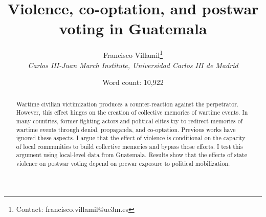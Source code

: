 \documentclass[12pt, notitlepage]{article}
\title{\Large Violence, co-optation, and postwar voting in Guatemala}
\author{Francisco Villamil\footnote{Contact: francisco.villamil@uc3m.es}\\\textit{Carlos III-Juan March Institute, Universidad Carlos III de Madrid}}
\date{Word count: 10,922}
\begin{document}
\maketitle
\thispagestyle{empty}

\vspace{30pt}

\begin{abstract}

Wartime civilian victimization produces a counter-reaction against the perpetrator. However, this effect hinges on the creation of collective memories of wartime events. In many countries, former fighting actors and political elites try to redirect memories of wartime events through denial, propaganda, and co-optation. Previous works have ignored these aspects. I argue that the effect of violence is conditional on the capacity of local communities to build collective memories and bypass those efforts. I test this argument using local-level data from Guatemala. Results show that the effects of state violence on postwar voting depend on prewar exposure to political mobilization.

\end{abstract}
\end{document}
